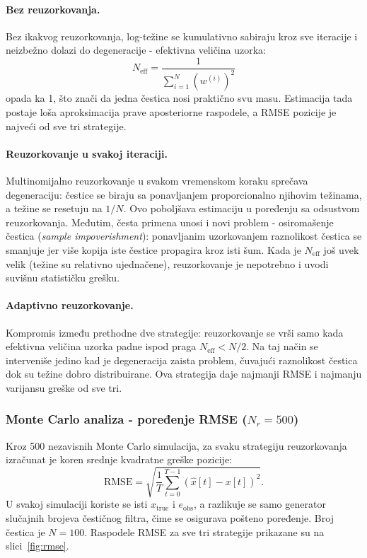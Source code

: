 \documentclass[12pt,a4paper]{article}
\begin{document}
\paragraph{Bez reuzorkovanja.}
Bez ikakvog reuzorkovanja, log-težine se kumulativno sabiraju kroz sve iteracije
i neizbežno dolazi do degeneracije - efektivna veličina uzorka:
\[
  N_\mathrm{eff} = \frac{1}{\sum_{i=1}^N (w^{(i)})^2}
\]
opada ka 1, što znači da jedna čestica nosi praktično svu masu.
Estimacija tada postaje loša aproksimacija prave aposteriorne raspodele,
a RMSE pozicije je najveći od sve tri strategije.

\paragraph{Reuzorkovanje u svakoj iteraciji.}
Multinomijalno reuzorkovanje u svakom vremenskom koraku sprečava degeneraciju:
čestice se biraju sa ponavljanjem proporcionalno njihovim težinama, a težine se
resetuju na $1/N$. Ovo poboljšava estimaciju u poređenju sa odsustvom reuzorkovanja.
Međutim, česta primena unosi i novi problem - osiromašenje čestica (\textit{sample
impoverishment}): ponavljanim uzorkovanjem raznolikost čestica se smanjuje jer
više kopija iste čestice propagira kroz isti šum. Kada je $N_\mathrm{eff}$ još
uvek velik (težine su relativno ujednačene), reuzorkovanje je nepotrebno i
uvodi suvišnu statističku grešku.

\paragraph{Adaptivno reuzorkovanje.}
Kompromis između prethodne dve strategije: reuzorkovanje se vrši samo kada
efektivna veličina uzorka padne ispod praga $N_\mathrm{eff} < N/2$.
Na taj način se interveniše jedino kad je degeneracija zaista problem,
čuvajući raznolikost čestica dok su težine dobro distribuirane.
Ova strategija daje najmanji RMSE i najmanju varijansu greške od sve tri.

\subsubsection*{Monte Carlo analiza - poređenje RMSE ($N_r = 500$)}

Kroz 500 nezavisnih Monte Carlo simulacija, za svaku strategiju reuzorkovanja
izračunat je koren srednje kvadratne greške pozicije:
\[
  \mathrm{RMSE} = \sqrt{\frac{1}{T}\sum_{t=0}^{T-1}(\hat{x}[t] - x[t])^2}.
\]
U svakoj simulaciji koriste se isti $x_\mathrm{true}$ i $e_\mathrm{obs}$, a razlikuje
se samo generator slučajnih brojeva čestičnog filtra, čime se osigurava pošteno poređenje.
Broj čestica je $N = 100$. Raspodele RMSE za sve tri strategije prikazane su na slici~\ref{fig:rmse}.
\end{document}
